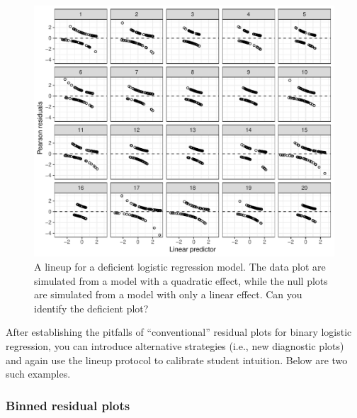 \documentclass[12pt]{article}
\begin{document}
\begin{figure}
\centering
\includegraphics{figs/logistic_residuals_bad.pdf}
\caption{\label{fig:logisticissue} A lineup for a deficient logistic
regression model. The data plot are simulated from a model with a
quadratic effect, while the null plots are simulated from a model with
only a linear effect. Can you identify the deficient plot?}
\end{figure}

After establishing the pitfalls of ``conventional'' residual plots for
binary logistic regression, you can introduce alternative strategies
(i.e., new diagnostic plots) and again use the lineup protocol to
calibrate student intuition. Below are two such examples.

\hypertarget{binned-residual-plots}{%
\subsubsection{Binned residual plots}\label{binned-residual-plots}}
\end{document}
